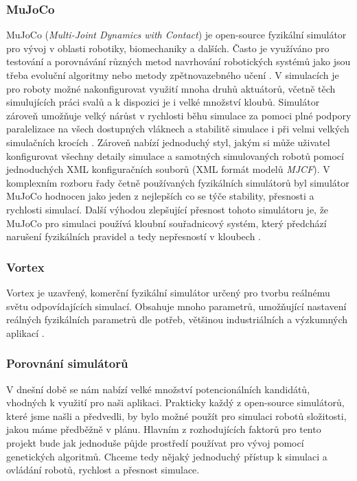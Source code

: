 \subsubsection{MuJoCo} \label{MuJoCo}
MuJoCo (\emph{Multi-Joint Dynamics with Contact}) \citep{deepmind_2021} je
open-source fyzikální simulátor pro vývoj v oblasti robotiky, biomechaniky a
dalších. Často je využíváno pro testování a porovnávání různých metod
navrhování robotických systémů jako jsou třeba evoluční algoritmy nebo metody
zpětnovazebného učení \citep{salimans2017evolution}. V simulacích je pro roboty
možné nakonfigurovat využití mnoha druhů aktuátorů, včetně těch simulujících
práci svalů a k dispozici je i velké množství kloubů. Simulátor zároveň
umožňuje velký nárůst v rychlosti běhu simulace za pomoci plné podpory
paralelizace na všech dostupných vláknech a stabilitě simulace i při velmi
velkých simulačních krocích \citep{todorov2012mujoco}. Zároveň nabízí
jednoduchý styl, jakým si může uživatel konfigurovat všechny detaily simulace a
samotných simulovaných robotů pomocí jednoduchých XML konfiguračních souborů
(XML formát modelů \emph{MJCF}). V komplexním rozboru řady četně používaných
fyzikálních simulátorů byl simulátor MuJoCo hodnocen jako jeden z nejlepších co
se týče stability, přesnosti a rychlosti simulací. Další výhodou zlepšující
přesnost tohoto simulátoru je, že MuJoCo pro simulaci používá kloubní
souřadnicový systém, který předchází narušení fyzikálních pravidel a tedy
nepřesností v kloubech \citep{erez2015simulation}.

\subsubsection{Vortex} \label{Vortex}
Vortex je uzavřený, komerční fyzikální simulátor určený pro tvorbu
reálnému světu odpovídajících simulací. Obsahuje mnoho parametrů,
umožňující nastavení reálných fyzikálních parametrů dle potřeb,
většinou industriálních a výzkumných aplikací \citep{coppeliarobotics}
\citep{yoon2023comparative}.

\subsubsection{Porovnání simulátorů} \label{Simulátory - Porovnání}
V dnešní době se nám nabízí velké množství potencionálních kandidátů, vhodných
k využití pro naši aplikaci. Prakticky každý z open-source simulátorů, které
jsme našli a předvedli, by bylo možné použít pro simulaci robotů složitosti,
jakou máme předběžně v plánu. Hlavním z rozhodujících faktorů pro tento projekt
bude jak jednoduše půjde prostředí používat pro vývoj pomocí genetických
algoritmů. Chceme tedy nějaký jednoduchý přístup k simulaci a ovládání robotů,
rychlost a přesnost simulace. 

